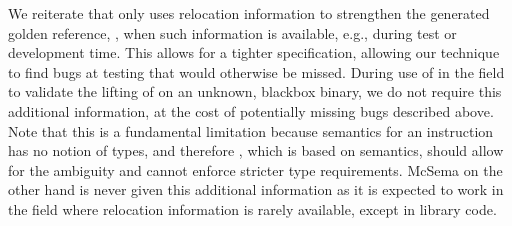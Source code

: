 We reiterate that \compd only uses relocation information to strengthen the
generated golden reference, , when such information is
available, e.g., during test or development time. This allows for a tighter
specification, allowing our technique to find bugs at testing that would 
otherwise
be missed. During use of \compd in the field to validate the lifting of
\mcsema on an unknown, blackbox binary, we do not require this additional
information, at the cost of potentially missing bugs described above. Note
that this is a fundamental limitation because \ISA semantics for an
instruction has no notion of types, and therefore , which is
based on \ISA semantics, should allow for the ambiguity and cannot enforce
stricter type requirements. McSema on the other hand is never given this
additional information as it is expected to work in the field where relocation
information is rarely available, except in library code.
